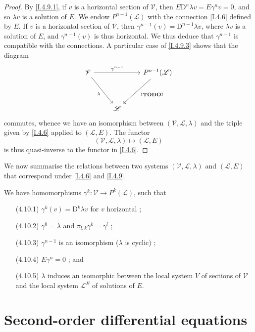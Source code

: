 \documentclass{report}
\theoremstyle{plain}
\theoremstyle{definition}
\newenvironment{env}[1]
    {\renewcommand\theinnercustomenv{#1}\innercustomenv}
    {\endinnercustomenv}
\newcommand{\sh}[1]{{\mathscr{#1}}}
\newcommand{\DD}{\mathrm{D}}
\newcommand{\todo}{\textbf{ !TODO! }}
\newcommand{\oldpage}[1]{\marginpar{\footnotesize$\Big\vert$ \textit{p.~#1}}}
\begin{document}
\begin{proof}
  By \cref{I.4.9.1}, if $v$ is a horizontal section of $\sh{V}$, then $E\DD^n\lambda v = E\gamma^n v = 0$, and so $\lambda v$ is a solution of $E$.
  We endow $P^{n-1}(\sh{L})$ with the connection \cref{I.4.6} defined by $E$.
  If $v$ is a horizontal section of $\sh{V}$, then $\gamma^{n-1}(v)=\DD^{n-1}\lambda v$, where $\lambda v$ is a solution of $E$, and $\gamma^{n-1}(v)$ is thus horizontal.
  We thus deduce that $\gamma^{n-1}$ is compatible with the connections.
  A particular case of \cref{I.4.9.3} shows that the diagram
  \[
    \begin{tikzcd}[row sep=huge]
      \sh{V} \ar[rr,"\gamma^{n-1}"] \drar[swap,"\lambda"]
      && P^{n-1}(\sh{L}) \dlar["\todo"]
    \\&\sh{L}&
    \end{tikzcd}
  \]
  commutes, whence we have an isomorphism between $(\sh{V},\sh{L},\lambda)$ and the triple given by \cref{I.4.6} applied to $(\sh{L},E)$.
  The functor
  \[
    (\sh{V},\sh{L},\lambda) \mapsto (\sh{L},E)
  \]
  is thus quasi-inverse to the functor in \cref{I.4.6}.
\end{proof}

\begin{env}{4.10}
\label{I.4.10}
  We now summarise the relations between two systems $(\sh{V},\sh{L},\lambda)$ and $(\sh{L},E)$ that correspond under \cref{I.4.6} and \cref{I.4.9}.

  We have homomorphisms $\gamma^k\colon\sh{V}\to P^k(\sh{L})$, such that
  \begin{enumerate}
    \item[(4.10.1)]\label{I.4.10.1}
      $\gamma^k(v) = \DD^k\lambda v$ for $v$ horizontal ;
\oldpage{29}
    \item[(4.10.2)]\label{I.4.10.2}
      $\gamma^0=\lambda$ and $\pi_{l,k}\gamma^k=\gamma^l$ ;
    \item[(4.10.3)]\label{I.4.10.3}
      $\gamma^{n-1}$ is an isomorphism ($\lambda$ is cyclic) ;
    \item[(4.10.4)]\label{I.4.10.4}
      $E\gamma^n=0$ ; and
    \item[(4.10.5)]\label{I.4.10.5}
      $\lambda$ induces an isomorphic between the local system $V$ of sections of $\sh{V}$ and the local system $\sh{L}^E$ of solutions of $E$.
  \end{enumerate}
\end{env}


\section{Second-order differential equations}
\label{I.5}
\end{document}
